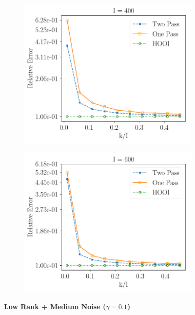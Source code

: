 \begin{figure}[H]
\begin{subfigure}{0.32\textwidth}
    \includegraphics[scale = 0.3]{figure/lk_mnoise_n400.pdf}
    \end{subfigure}
    \begin{subfigure}{0.32\textwidth}
    \includegraphics[scale = 0.3]{figure/lk_mnoise_n600.pdf}
    \end{subfigure}
\textbf{Low Rank + Medium Noise ($\gamma = 0.1$)} \\ 
    \begin{subfigure}{0.32\textwidth}

\end{subfigure}
\end{figure}
